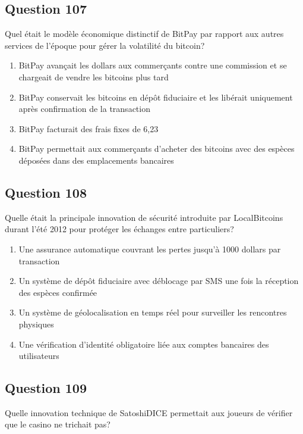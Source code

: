 \documentclass[12pt,a4paper]{article}
\begin{document}
\subsection*{Question 107}
Quel était le modèle économique distinctif de BitPay par rapport aux autres services de l'époque pour gérer la volatilité du bitcoin?

\begin{enumerate}[label=\Alph*., leftmargin=*]
\item BitPay avançait les dollars aux commerçants contre une commission et se chargeait de vendre les bitcoins plus tard
\item BitPay conservait les bitcoins en dépôt fiduciaire et les libérait uniquement après confirmation de la transaction
\item BitPay facturait des frais fixes de 6,23%
\item BitPay permettait aux commerçants d'acheter des bitcoins avec des espèces déposées dans des emplacements bancaires
\end{enumerate}

\bigskip


\subsection*{Question 108}
Quelle était la principale innovation de sécurité introduite par LocalBitcoins durant l'été 2012 pour protéger les échanges entre particuliers?

\begin{enumerate}[label=\Alph*., leftmargin=*]
\item Une assurance automatique couvrant les pertes jusqu'à 1000 dollars par transaction
\item Un système de dépôt fiduciaire avec déblocage par SMS une fois la réception des espèces confirmée
\item Un système de géolocalisation en temps réel pour surveiller les rencontres physiques
\item Une vérification d'identité obligatoire liée aux comptes bancaires des utilisateurs
\end{enumerate}

\bigskip


\subsection*{Question 109}
Quelle innovation technique de SatoshiDICE permettait aux joueurs de vérifier que le casino ne trichait pas?
\end{document}
